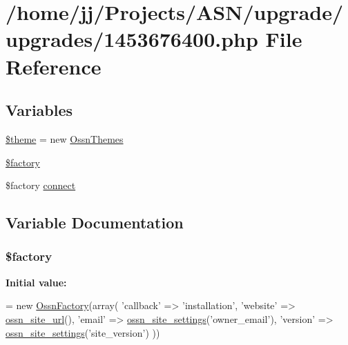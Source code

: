 \hypertarget{1453676400_8php}{}\section{/home/jj/\+Projects/\+A\+S\+N/upgrade/upgrades/1453676400.php File Reference}
\label{1453676400_8php}
\subsection*{Variables}
\begin{DoxyCompactItemize}
\item 
\hyperlink{1453676400_8php_a1ae541f7fe1c5e21cb4535f88ec9e9dc}{\$theme} = new \hyperlink{class_ossn_themes}{Ossn\+Themes}
\item 
\hyperlink{1453676400_8php_a099b374dc664ee043fffcd6ea05e3e70}{\$factory}
\item 
\$factory \hyperlink{1453676400_8php_a3fdbedd7713e458f25fcf7dc1f562a3d}{connect}
\end{DoxyCompactItemize}


\subsection{Variable Documentation}
\subsubsection[{\texorpdfstring{\$factory}{$factory}}]{\setlength{\rightskip}{0pt plus 5cm}\$factory}\hypertarget{1453676400_8php_a099b374dc664ee043fffcd6ea05e3e70}{}\label{1453676400_8php_a099b374dc664ee043fffcd6ea05e3e70}
{\bfseries Initial value\+:}
\begin{DoxyCode}
= \textcolor{keyword}{new} \hyperlink{class_ossn_factory}{OssnFactory}(array(
        \textcolor{stringliteral}{'callback'} => \textcolor{stringliteral}{'installation'},
        \textcolor{stringliteral}{'website'} => \hyperlink{ossn_8lib_8system_8php_a2f12f9244f99eccd1225afb76ef2ab65}{ossn\_site\_url}(),
        \textcolor{stringliteral}{'email'} => \hyperlink{ossn_8lib_8system_8php_a610e2045b8a86c09f777b4d82e24e34c}{ossn\_site\_settings}(\textcolor{stringliteral}{'owner\_email'}),
        \textcolor{stringliteral}{'version'} => \hyperlink{ossn_8lib_8system_8php_a610e2045b8a86c09f777b4d82e24e34c}{ossn\_site\_settings}(\textcolor{stringliteral}{'site\_version'})
))
\end{DoxyCode}


